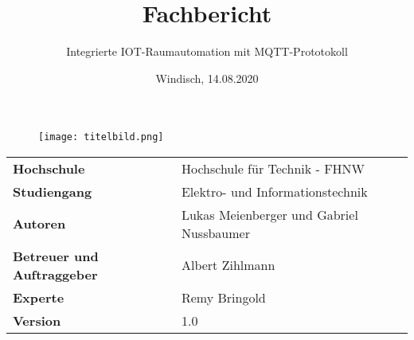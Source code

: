 \documentclass[final]{fhnwreport}         %
\title{Fachbericht}  %
\author{Integrierte IOT-Raumautomation mit MQTT-Prototokoll}                      %
\date{Windisch, 14.08.2020}               %
\begin{document}
\maketitle

\vspace*{-1cm}
\vfill
\begin{figure}[H]
\centering
\texttt{[image: titelbild.png]}
\end{figure}
\vfill

\begin{center}
\renewcommand\arraystretch{2}
\begin{tabular}{>{\bf}p{6cm} l}
Hochschule                 &    Hochschule für Technik - FHNW\\
Studiengang                &    Elektro- und Informationstechnik\\
Autoren   		                 & 	 Lukas Meienberger und Gabriel Nussbaumer\\
Betreuer und Auftraggeber     &     Albert Zihlmann\\
Experte               &   Remy Bringold \\
Version                    &    1.0 %
\end{tabular}
\end{center}

\clearpage
			
\thispagestyle{empty}


\tableofcontents
\clearpage











{\sloppypar
\printbibliography[heading=bibintoc]
}

%

\end{document}
